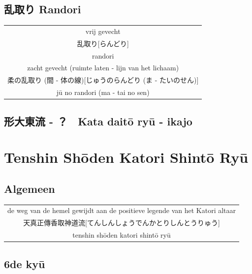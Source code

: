 \documentclass[12pt]{scrartcl}
\begin{document}
\begin{CJK*}{UTF8}{min}
\subsection{乱取り Randori}
\begin{table}[H]
\begin{center}
\begin{tabular}{c}
vrij gevecht\\
乱取り[らんどり]\\
randori\\
\hline
zacht gevecht (ruimte laten - lijn van het lichaam)\\
柔の乱取り (間 - 体の線)[じゅうのらんどり (ま - たいのせん)] \\
j\={u} no randori (ma - tai no sen)
\end{tabular}
\end{center}
\label{randori}
\end{table}

\subsection{形大東流 - ？　Kata dait\={o} ry\={u} - ikajo}

\newpage
\section{Tenshin Sh\={o}den Katori Shint\={o} Ry\={u}}
\subsection{Algemeen}
\begin{table}[H]
\begin{center}
\begin{tabular}{c}
de weg van de hemel gewijdt aan de positieve legende van het Katori altaar\\ 
天真正傳香取神道流[てんしんしょうでんかとりしんとうりゅう]\\
tenshin sh\={o}den katori shint\={o} ry\={u}
\end{tabular}
\end{center}
\label{katori}
\end{table}


\subsection{6de ky\={u}}

\end{CJK*}
\end{document}
